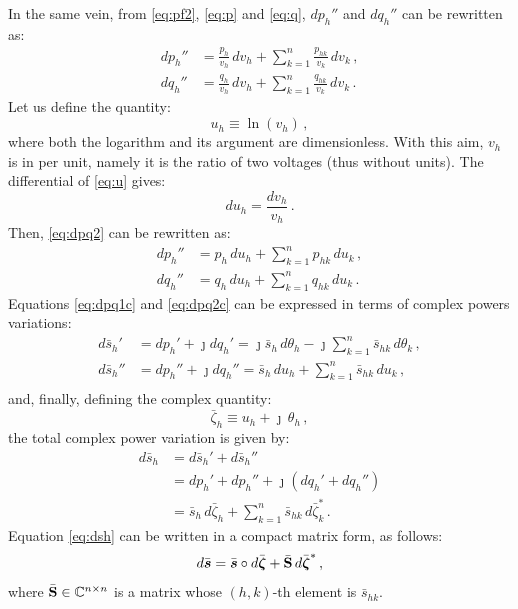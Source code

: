 \documentclass[journal, twocolumn, letter]{IEEEtran}
\newcommand{\bfg}[1]{\boldsymbol{#1}}
\newcommand{\bfb}[1]{\boldsymbol{\rm #1}}
\newcommand{\vh}{v_h}
\newcommand{\vk}{v_k}
\newcommand{\uh}{u_h}
\newcommand{\uk}{u_k}
\newcommand{\eh}{\bar{\zeta}_h}
\newcommand{\ek}{\bar{\zeta}_k}
\newcommand{\ph}{p_h}
\newcommand{\qh}{q_h}
\newcommand{\sh}{\bar{s}_h}
\newcommand{\shk}{\bar{s}_{hk}}
\renewcommand{\th}{\theta_h}
\newcommand{\tho}{\theta_{h}}
\newcommand{\tko}{\theta_{k}}
\newcommand{\sk}{{\textstyle \sum}_{k=1}^{n}}
\newcommand{\jj}{\jmath}
\newcommand{\phk}{p_{hk}}
\newcommand{\qhk}{q_{hk}}
\newcommand{\svec}{\bar{\bfg s}}
\newcommand{\zvec}{\bar{\bfg \zeta}}
\newcommand{\Sbus}{\bar{\bfb S}}
\begin{document}
In the same vein, from \eqref{eq:pf2}, \eqref{eq:p} and \eqref{eq:q},
$d \ph''$ and $d \qh''$ can be rewritten as:
\begin{equation}
  \label{eq:dpq2}
  \begin{aligned}
    d \ph'' &= \frac{\ph}{\vh} \, d \vh + \sk \frac{\phk}{\vk} \, d \vk \, , \\
    d \qh'' &= \frac{\qh}{\vh} \, d \vh + \sk \frac{\qhk}{\vk} \, d \vk \, .
  \end{aligned}
\end{equation}
Let us define the quantity:
\begin{equation}
  \label{eq:u}
  \uh \equiv \ln \left (\vh \right ) \, ,
\end{equation}
where both the logarithm and its argument are
dimensionless.  With this aim, $\vh$ is in per unit, namely it is the
ratio of two voltages (thus without units).   The
differential of \eqref{eq:u} gives:
\begin{equation}
  \label{eq:du}
  d \uh = \frac{d \vh}{\vh} \, .
\end{equation}
Then, \eqref{eq:dpq2} can be rewritten as:
\begin{equation}
  \label{eq:dpq2c}
  \begin{aligned}
    d \ph'' &= \ph \, d \uh + \sk \phk \, d \uk \, , \\
    d \qh'' &= \qh \, d \uh + \sk \qhk \, d \uk \, .
  \end{aligned} 
\end{equation}
Equations \eqref{eq:dpq1c} and \eqref{eq:dpq2c} can be expressed in terms of
complex powers variations:
\begin{equation}
  \label{eq:ds12}
  \begin{aligned}
    d \sh' &= d \ph' + \jj d \qh' = \jj \sh \, d \tho - \jj \sk \shk \, d \tko \, , \\
    d \sh'' &= d \ph'' + \jj d \qh'' = \sh \, d \uh + \sk \shk \, d \uk \, , \\
  \end{aligned}
\end{equation}
and, finally, defining the complex quantity:
\begin{equation}
  \label{eq:e}
  \eh \equiv \uh + \jj \, \th \, , 
\end{equation}
the total complex power variation is given by:
\begin{equation}
  \label{eq:dsh}
  \begin{aligned}
    d \sh &= d \sh' + d \sh'' \\
    &= d \ph' + d \ph'' + \jj (d \qh' + d \qh'') \\
    &= \sh \, d \eh + \sk \shk \, d \ek^* \, .
  \end{aligned}
\end{equation}
Equation \eqref{eq:dsh} can be written in a compact matrix form, as
follows:
\begin{equation}
  \label{eq:svec}
  d \svec = \svec \circ d \zvec + \Sbus \, d \zvec^* \, ,
\end{equation}
where $\Sbus \in \mathbb{C}^{n \times n}$ is a matrix whose $(h,k)$-th
element is $\shk$.
\end{document}
